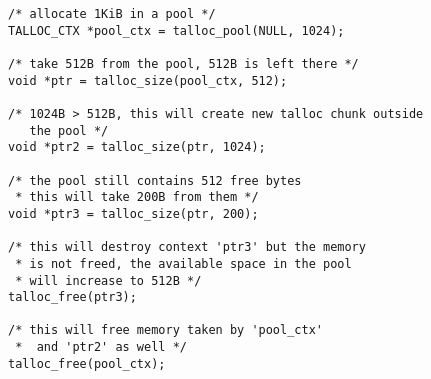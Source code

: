 \begin{lstlisting}[caption={Talloc pool},label=lst:talloc_pool]
/* allocate 1KiB in a pool */
TALLOC_CTX *pool_ctx = talloc_pool(NULL, 1024);

/* take 512B from the pool, 512B is left there */
void *ptr = talloc_size(pool_ctx, 512);

/* 1024B > 512B, this will create new talloc chunk outside
   the pool */
void *ptr2 = talloc_size(ptr, 1024);

/* the pool still contains 512 free bytes
 * this will take 200B from them */
void *ptr3 = talloc_size(ptr, 200);

/* this will destroy context 'ptr3' but the memory
 * is not freed, the available space in the pool
 * will increase to 512B */
talloc_free(ptr3);

/* this will free memory taken by 'pool_ctx'
 *  and 'ptr2' as well */
talloc_free(pool_ctx);
\end{lstlisting}
